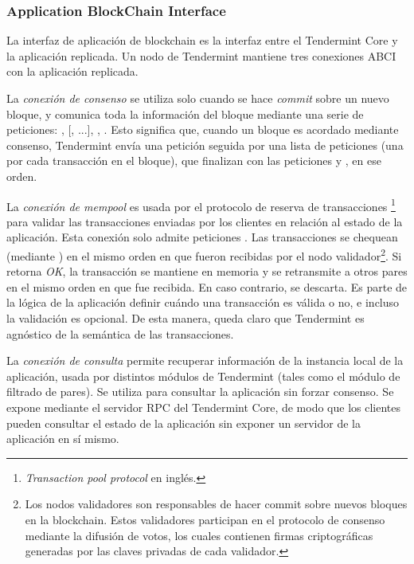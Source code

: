 \subsubsection{Application BlockChain Interface}\label{subsec:abci}
La interfaz de aplicación de blockchain es la interfaz entre el Tendermint Core y la aplicación replicada.
%
Un nodo de Tendermint mantiene tres conexiones ABCI con la aplicación replicada.
%

La \textit{conexión de consenso} se utiliza solo cuando se hace \textit{commit} sobre un nuevo bloque,
y comunica toda la información del bloque mediante una serie de peticiones: 
\BeginBlock, [\DeliverTx, ...], \EndBlock, \Commit.
%
Esto significa que, cuando un bloque es acordado mediante consenso, Tendermint envía una petición \BeginBlock
seguida por una lista de peticiones \DeliverTx (una por cada transacción en el bloque), que finalizan con las
peticiones \EndBlock y \Commit, en ese orden.

%

La \textit{conexión de mempool} es usada por el protocolo de reserva de transacciones \footnote{\textit{Transaction pool protocol}
en inglés.} para validar las transacciones enviadas por los clientes en relación al estado de la aplicación.
%
Esta conexión solo admite peticiones \CheckTx. Las transacciones se chequean (mediante \CheckTx) en el mismo orden
en que fueron recibidas por el nodo validador\footnote{Los nodos validadores son responsables de hacer commit sobre nuevos
bloques en la blockchain. Estos validadores participan en el protocolo de consenso mediante la difusión de votos, los
cuales contienen firmas criptográficas generadas por las claves privadas de cada validador.}.
%
Si \CheckTx retorna \textit{OK}, la transacción se mantiene en memoria y se retransmite a otros pares en el mismo orden
en que fue recibida.
%
En caso contrario, se descarta.
%
Es parte de la lógica de la aplicación definir cuándo una transacción es válida o no, e incluso la validación es opcional.
%
De esta manera, queda claro que Tendermint es agnóstico de la semántica de las transacciones.

%

La \textit{conexión de consulta} permite recuperar información de la instancia local de la aplicación, usada
por distintos módulos de Tendermint (tales como el módulo de filtrado de pares).
%
Se utiliza para consultar la aplicación sin forzar consenso.
%
Se expone mediante el servidor RPC del Tendermint Core, de modo que los clientes pueden
consultar el estado de la aplicación sin exponer un servidor de la aplicación en sí mismo. 

